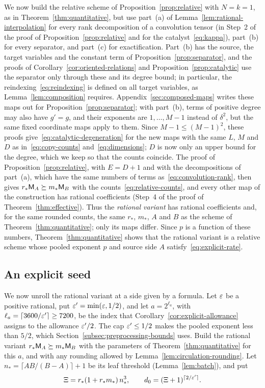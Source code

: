 We now build the relative scheme of Proposition~\ref{prop:relative}
with \(N=k=1\), as in Theorem~\ref{thm:quantitative}, but use part~(a)
of Lemma~\ref{lem:rational-interpolation} for every rank decomposition
of a convolution tensor (in Step~2 of the proof of
Proposition~\ref{prop:relative} and for the catalyst~\eqref{eq:kappa}),
part~(b) for every separator, and part~(c) for exactification. Part~(b)
has the source, the target variables and the constant term of
Proposition~\ref{prop:separator}, and the proofs of
Corollary~\ref{cor:oriented-relations} and
Proposition~\ref{prop:catalytic} use the separator only through these
and its degree bound; in particular, the
reindexing~\eqref{eq:reindexing} is defined on all target variables, as
Lemma~\ref{lem:composition} requires. Appendix~\ref{sec:composed-maps}
writes these maps out for Proposition~\ref{prop:separator}; with
part~(b), terms of positive degree may also have \(g'=g\), and their
exponents are \(1,\ldots,M-1\) instead of \(\delta^2\), but the same
fixed coordinate maps apply to them. Since \(M-1\le(M-1)^2\), these
proofs give~\eqref{eq:catalytic-degeneration} for the new maps with the same
\(L\), \(M\) and \(D\) as in~\eqref{eq:copy-counts}
and~\eqref{eq:dimensions}; \(D\) is now only an upper bound for the
degree, which we keep so that the counts coincide. The proof of
Proposition~\ref{prop:relative}, with \(E=D+1\) and with the
decompositions of part~(a), which have the same numbers of terms
as~\eqref{eq:convolution-rank}, then gives
\(r_*\mathsf M_A\succeq m_*\mathsf M_B\) with the counts~\eqref{eq:relative-counts},
and every other map of the construction has rational coefficients
(Step~4 of the proof of Theorem~\ref{thm:effective}). Thus the
\emph{rational variant} has rational coefficients and, for the same
rounded counts, the same \(r_*\), \(m_*\), \(A\) and \(B\) as the scheme
of Theorem~\ref{thm:quantitative}; only its maps differ. Since \(p\) is a
function of these numbers, Theorem~\ref{thm:quantitative} shows that
the rational variant is a relative scheme whose pooled exponent \(p\)
and source side \(A\) satisfy~\eqref{eq:explicit-rate}.

\subsection{An explicit seed}
\label{subsec:bounded-seed}

We now unroll the rational variant at a side given by a formula. Let
\(\varepsilon\) be a positive rational, put \(\varepsilon'=\min(\varepsilon,1/2)\), and let
\(a=2^{\ell_a}\), with \(\ell_a=\lceil3600/\varepsilon'\rceil\ge7200\), be
the index that Corollary~\ref{cor:explicit-allowance} assigns to the
allowance \(\varepsilon'/2\). The cap \(\varepsilon'\le1/2\) makes the pooled
exponent less than \(5/2\), which Section~\ref{subsec:preprocessing-bounds}
uses. Build the rational variant
\(r_*\mathsf M_A\succeq m_*\mathsf M_B\) with the parameters of
Theorem~\ref{thm:quantitative} for this \(a\), and with any rounding
allowed by Lemma~\ref{lem:circulation-rounding}. Let
\(n_*=\lceil AB/(B-A)\rceil+1\) be its leaf threshold
(Lemma~\ref{lem:batch}), and put
\begin{equation}\label{eq:bounded-seed-parameters}
 \Xi=r_*(1+r_*m_*)\,n_*^3,\qquad
 d_0=(\Xi+1)^{\lceil2/\varepsilon'\rceil}.
\end{equation}

